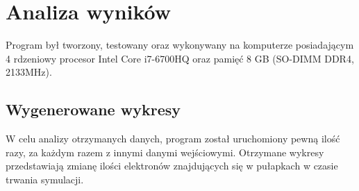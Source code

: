 \chapter{Analiza wyników}

Program był tworzony, testowany oraz wykonywany na komputerze posiadającym 4 rdzeniowy procesor Intel Core i7-6700HQ oraz pamięć 8 GB (SO-DIMM DDR4, 2133MHz).


\section{Wygenerowane wykresy}
W celu analizy otrzymanych danych, program został uruchomiony pewną ilość razy, za każdym razem z innymi danymi wejściowymi. Otrzymane wykresy przedstawiają zmianę ilości elektronów znajdujących się w pułapkach w czasie trwania symulacji.


